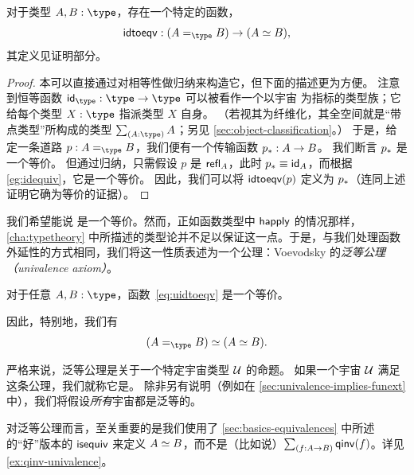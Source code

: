 \begin{lem}\label{thm:idtoeqv}
  对于类型 $A,B:\type$，存在一个特定的函数，
  \begin{equation}\label{eq:uidtoeqv}
    \idtoeqv : (\id[\type]AB) \to (\eqv A B),
  \end{equation}
  其定义见证明部分。
\end{lem}

\begin{proof}
  本可以直接通过对相等性做归纳来构造它，但下面的描述更为方便。
  注意到恒等函数 $\idfunc[\type]:\type\to\type$ 可以被看作一个以宇宙 \type 为指标的类型族；它给每个类型 $X:\type$ 指派类型 $X$ 自身。
  （若视其为纤维化，其全空间就是``带点类型''所构成的类型 $\sm{A:\type}A$；另见 \cref{sec:object-classification}。）
  于是，给定一条道路 $p:A =_{\type} B$，我们便有一个传输函数 $\transf{p}:A \to B$。
  我们断言 $\transf{p}$ 是一个等价。
  但通过归纳，只需假设 $p$ 是 $\refl A$，此时 $\transf{p} \jdeq \idfunc[A]$，而根据 \cref{eg:idequiv}，它是一个等价。
  因此，我们可以将 $\idtoeqv(p)$ 定义为 $\transf{p}$（连同上述证明它确为等价的证据）。
\end{proof}

我们希望能说 \idtoeqv 是一个等价。然而，正如函数类型中 $\happly$ 的情况那样，\cref{cha:typetheory} 中所描述的类型论并不足以保证这一点。于是，与我们处理函数外延性的方式相同，我们将这一性质表述为一个公理：Voevodsky 的\emph{泛等公理（univalence axiom）}。

\begin{axiom}[泛等]\label{axiom:univalence}
  对于任意 $A,B:\type$，函数~\eqref{eq:uidtoeqv} 是一个等价。
\end{axiom}

因此，特别地，我们有
  \[
\eqv{(\id[\type]{A}{B})}{(\eqv A B)}.
\]

严格来说，泛等公理是关于一个特定宇宙类型 $\UU$ 的命题。
如果一个宇宙 $\UU$ 满足这条公理，我们就称它是。
%
%
除非另有说明（例如在 \cref{sec:univalence-implies-funext} 中），我们将假设\emph{所有}宇宙都是泛等的。

\begin{rmk}
  对泛等公理而言，至关重要的是我们使用了 \cref{sec:basics-equivalences} 中所述的``好''版本的 $\isequiv$ 来定义 $\eqv AB$，而不是（比如说）$\sm{f:A\to B} \qinv(f)$。详见 \cref{ex:qinv-univalence}。
\end{rmk}

